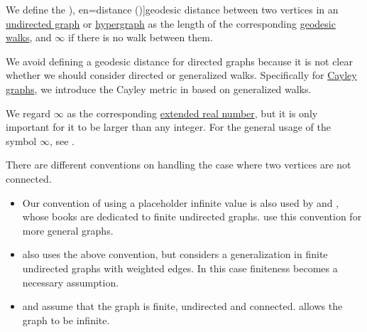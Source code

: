 \begin{definition}\label{def:graph_geodesic_distance}
  We define the \term[ru=расстояние (\cite[34]{ЕмеличевИПр1990ТеорияГрафов}), en=distance (\cite[def. 1.1.5]{Knauer2019AlgebraicGraphTheory})]{geodesic distance} between two vertices in an \hyperref[def:undirected_graph]{undirected graph} or \hyperref[def:hypergraph]{hypergraph} as the length of the corresponding \hyperref[def:graph_geodesic]{geodesic walks}, and \( \infty \) if there is no walk between them.
\end{definition}
\begin{comments}
  \item We avoid defining a geodesic distance for directed graphs because it is not clear whether we should consider directed or generalized walks. Specifically for \hyperref[def:cayley_graph]{Cayley graphs}, we introduce the Cayley metric in  based on generalized walks.

  \item We regard \( \infty \) as the corresponding \hyperref[def:extended_real_numbers]{extended real number}, but it is only important for it to be larger than any integer. For the general usage of the symbol \( \infty \), see .

  \item There are different conventions on handling the case where two vertices are not connected.
  \begin{itemize}
    \item Our convention of using a placeholder infinite value is also used by  and , whose books are dedicated to finite undirected graphs.  use this convention for more general graphs.

    \item {} also uses the above convention, but considers a generalization in finite undirected graphs with weighted edges. In this case finiteness becomes a necessary assumption.

    \item {} and  assume that the graph is finite, undirected and connected.  allows the graph to be infinite.
  \end{itemize}
\end{comments}

